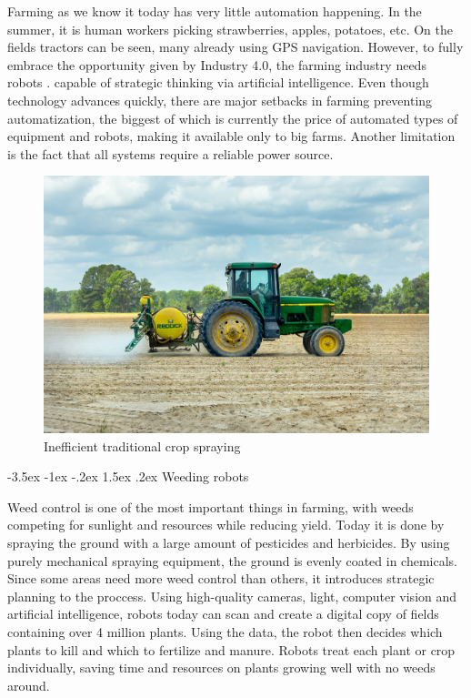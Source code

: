 \documentclass[a4paper,10pt]{article}
\makeatletter
\theoremstyle{definition}
\renewcommand\section{\@startsection {section}{1}{\z@}%
                                   {-3.5ex \@plus -1ex \@minus -.2ex}%
                                   {1.5ex \@plus.2ex}%
                                   {\large\bfseries}}
\makeatother
\begin{document}
Farming as we know it today has very little automation happening. In the summer, it is human workers picking strawberries, apples, potatoes, etc. On the fields tractors can be seen, many already using GPS navigation. However, to fully embrace the opportunity given by Industry 4.0, the farming industry needs robots \cite{SICILIANO_rhandbook}. capable of strategic thinking via artificial intelligence. Even though technology advances quickly, there are major setbacks in farming preventing automatization, the biggest of which is currently the price of automated types of equipment and robots, making it available only to big farms. Another limitation is the fact that all systems require a reliable power source.

\bigskip

\begin{figure}[h]
\begin{center}
\includegraphics[scale=0.06]{image/traditional_farming.jpg}
\caption{Inefficient traditional crop spraying}
\end{center}
\end{figure}

\newpage

\section{Weeding robots}
\label{sec:3}

Weed control is one of the most important things in farming, with weeds competing for sunlight and resources while reducing yield\cite{9396005}. Today it is done by spraying the ground with a large amount of pesticides and herbicides. By using purely mechanical spraying equipment, the ground is evenly coated in chemicals. Since some areas need more weed control than others, it introduces strategic planning to the proccess\cite{McVLAHpD06ypNajG}. Using high-quality cameras, light, computer vision and artificial intelligence, robots today can scan and create a digital copy of fields containing over 4 million plants. Using the data, the robot then decides which plants to kill and which to fertilize and manure\cite{9798733}. Robots treat each plant or crop individually, saving time and resources on plants growing well with no weeds around. 
\bigskip
\end{document}
